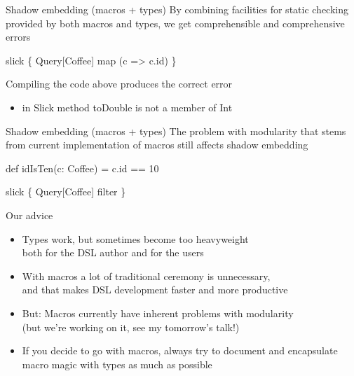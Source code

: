 \documentclass{beamer}
\begin{document}
\begin{frame}[fragile]{Shadow embedding (macros + types)}
  By combining facilities for static checking provided by both macros and types,
  we get comprehensible and comprehensive errors

  \vspace{1em}
  \begin{semiverbatim}
slick \{
  Query[Coffee] map
    (c => c.id\text{\color{blue}{.toDouble}})
\}\end{semiverbatim}

  \vspace{1em}
  Compiling the code above produces the correct error
  \begin{itemize}
  \item in Slick method toDouble is not a member of Int
  \end{itemize}
\end{frame}

\begin{frame}[fragile]{Shadow embedding (macros + types)}
  The problem with modularity that stems from current implementation of macros
  still affects shadow embedding

  \vspace{1em}
  \begin{semiverbatim}
def idIsTen(c: Coffee) = c.id == 10

slick \{
  Query[Coffee] filter \text{\color{blue}{idIsTen}}
\}
  \end{semiverbatim}
\end{frame}

\begin{frame}{Our advice}
  \begin{itemize}
  \item Types work, but sometimes become too heavyweight\\
        both for the DSL author and for the users
  \item With macros a lot of traditional ceremony is unnecessary,\\
        and that makes DSL development faster and more productive
  \item But: Macros currently have inherent problems with modularity\\
        (but we're working on it, see my tomorrow's talk!)
  \item If you decide to go with macros, always try to document and encapsulate
        macro magic with types as much as possible
  \end{itemize}
\end{frame}
\end{document}

